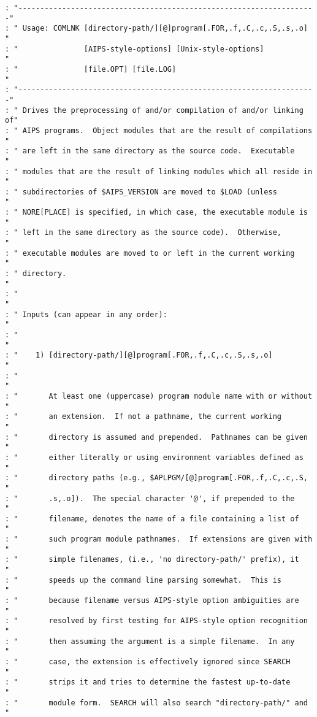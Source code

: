 \begin{verbatim}
: "--------------------------------------------------------------------"
: " Usage: COMLNK [directory-path/][@]program[.FOR,.f,.C,.c,.S,.s,.o]  "
: "               [AIPS-style-options] [Unix-style-options]            "
: "               [file.OPT] [file.LOG]                                "
: "--------------------------------------------------------------------"
: " Drives the preprocessing of and/or compilation of and/or linking of"
: " AIPS programs.  Object modules that are the result of compilations "
: " are left in the same directory as the source code.  Executable     "
: " modules that are the result of linking modules which all reside in "
: " subdirectories of $AIPS_VERSION are moved to $LOAD (unless         "
: " NORE[PLACE] is specified, in which case, the executable module is  "
: " left in the same directory as the source code).  Otherwise,        "
: " executable modules are moved to or left in the current working     "
: " directory.                                                         "
: "                                                                    "
: " Inputs (can appear in any order):                                  "
: "                                                                    "
: "    1) [directory-path/][@]program[.FOR,.f,.C,.c,.S,.s,.o]          "
: "                                                                    "
: "       At least one (uppercase) program module name with or without "
: "       an extension.  If not a pathname, the current working        "
: "       directory is assumed and prepended.  Pathnames can be given  "
: "       either literally or using environment variables defined as   "
: "       directory paths (e.g., $APLPGM/[@]program[.FOR,.f,.C,.c,.S,  "
: "       .s,.o]).  The special character '@', if prepended to the     "
: "       filename, denotes the name of a file containing a list of    "
: "       such program module pathnames.  If extensions are given with "
: "       simple filenames, (i.e., 'no directory-path/' prefix), it    "
: "       speeds up the command line parsing somewhat.  This is        "
: "       because filename versus AIPS-style option ambiguities are    "
: "       resolved by first testing for AIPS-style option recognition  "
: "       then assuming the argument is a simple filename.  In any     "
: "       case, the extension is effectively ignored since SEARCH      "
: "       strips it and tries to determine the fastest up-to-date      "
: "       module form.  SEARCH will also search "directory-path/" and  "

\end{verbatim}
